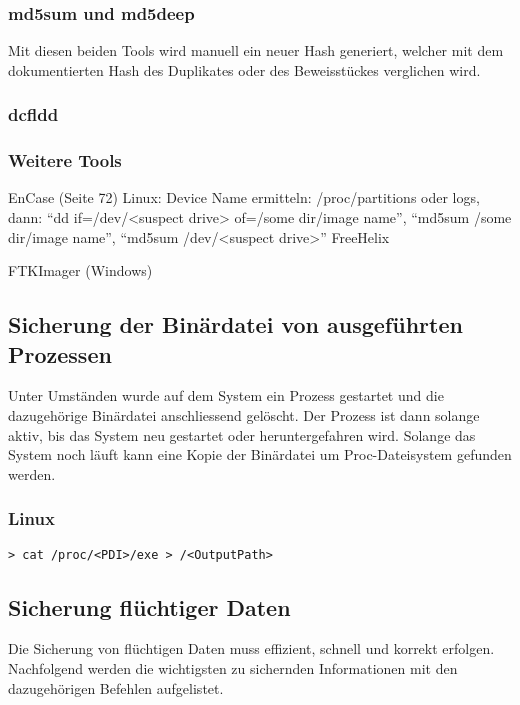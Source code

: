 \subsubsection{md5sum und md5deep}
Mit diesen beiden Tools wird manuell ein neuer Hash generiert, welcher mit dem dokumentierten Hash des Duplikates oder des Beweisstückes verglichen wird.

\subsubsection{dcfldd}

\subsubsection{Weitere Tools} 
EnCase (Seite 72)
Linux: Device Name ermitteln: /proc/partitions oder logs, dann: "`dd if=/dev/<suspect drive> of=/some dir/image name"', "`md5sum /some dir/image name"', "`md5sum /dev/<suspect drive>"'
FreeHelix

FTKImager (Windows)



\subsection{Sicherung der Binärdatei von ausgeführten Prozessen}
Unter Umständen wurde auf dem System ein Prozess gestartet und die dazugehörige Binärdatei anschliessend gelöscht. Der Prozess ist dann solange aktiv, bis das System neu gestartet oder heruntergefahren wird. Solange das System noch läuft kann eine Kopie der Binärdatei um Proc-Dateisystem gefunden werden.

\subsubsection{Linux}
\begin{lstlisting}
> cat /proc/<PDI>/exe > /<OutputPath>
\end{lstlisting}



\subsection{Sicherung flüchtiger Daten}
Die Sicherung von flüchtigen Daten muss effizient, schnell und korrekt erfolgen. Nachfolgend werden die wichtigsten zu sichernden Informationen mit den dazugehörigen Befehlen aufgelistet.

